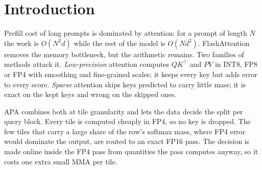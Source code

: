 \documentclass[10pt,twocolumn]{article}
\begin{document}
\section{Introduction}

Prefill cost of long prompts is dominated by attention: for a prompt of length $N$ the work is
$O(N^2 d)$ while the rest of the model is $O(N d^2)$. FlashAttention \cite{dao2022flashattention,
dao2024flashattention2,shah2024flashattention3} removes the memory bottleneck, but the arithmetic remains.
Two families of methods attack it. \emph{Low-precision} attention \cite{zhang2025sageattention,
zhang2025sageattention2,zhang2025sageattention3} computes $QK^\top$ and $PV$ in INT8, FP8 or FP4 with
smoothing and fine-grained scales; it keeps every key but adds error to every score. \emph{Sparse}
attention \cite{xiao2024streamingllm,jiang2024minference,tang2024quest} skips keys predicted to carry little
mass; it is exact on the kept keys and wrong on the skipped ones.

APA combines both at tile granularity and lets the data decide the split per query block. Every tile is
computed cheaply in FP4, so no key is dropped. The few tiles that carry a large share of the row's softmax
mass, where FP4 error would dominate the output, are routed to an exact FP16 pass. The decision is made
online inside the FP4 pass from quantities the pass computes anyway, so it costs one extra small MMA per tile.
\end{document}
